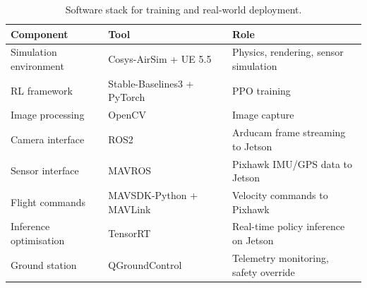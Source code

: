 \begin{table}[H]
    \small
    \centering
    \caption{Software stack for training and real-world deployment.}
    \label{tab:software}
    \begin{tabular}{p{4cm} p{4cm} p{5.5cm}}
        \hline\hline
        \rowcolor{lightgray}\textbf{Component} & \textbf{Tool} & \textbf{Role} \\\hline
        Simulation environment & Cosys-AirSim + UE 5.5 & Physics, rendering, sensor simulation \\
        \rowcolor{lightlightgray} RL framework & Stable-Baselines3 + PyTorch & PPO training \\
        Image processing & OpenCV & Image capture \\
        \rowcolor{lightlightgray} Camera interface & ROS2 & Arducam frame streaming to Jetson \\
        Sensor interface & MAVROS & Pixhawk IMU/GPS data to Jetson \\
        \rowcolor{lightlightgray} Flight commands & MAVSDK-Python + MAVLink & Velocity commands to Pixhawk \\
        Inference optimisation & TensorRT & Real-time policy inference on Jetson \\
        \rowcolor{lightlightgray} Ground station & QGroundControl & Telemetry monitoring, safety override \\
        \hline
    \end{tabular}
\end{table}
